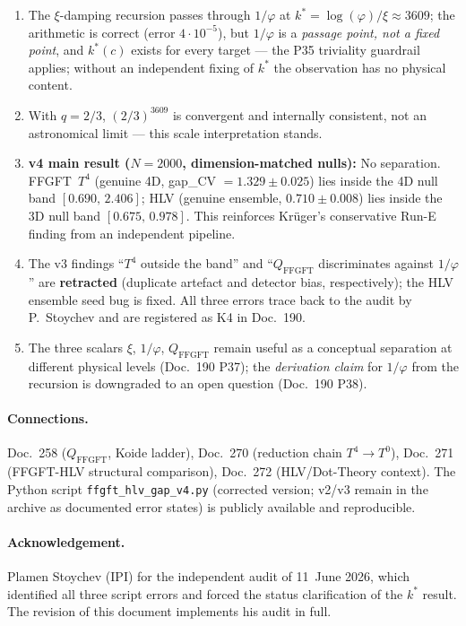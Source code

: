 \begin{enumerate}
  \item The $\xi$-damping recursion passes through $1/\varphi$ at
        $k^* = \log(\varphi)/\xi \approx 3609$; the arithmetic is
        correct (error $4{\cdot}10^{-5}$), but $1/\varphi$ is a
        \emph{passage point, not a fixed point}, and $k^*(c)$ exists
        for every target --- the P35 triviality guardrail applies;
        without an independent fixing of $k^*$ the observation has no
        physical content.
  \item With $q = 2/3$, $(2/3)^{3609}$ is convergent and internally
        consistent, not an astronomical limit --- this scale
        interpretation stands.
  \item \textbf{v4 main result ($N=2000$, dimension-matched nulls):}
        No separation. FFGFT~$T^4$ (genuine 4D,
        gap\_CV $=1.329\pm0.025$) lies inside the 4D null band
        $[0.690,\,2.406]$; HLV (genuine ensemble, $0.710\pm0.008$)
        lies inside the 3D null band $[0.675,\,0.978]$. This
        reinforces Krüger's conservative Run-E finding from an
        independent pipeline.
  \item The v3 findings \enquote{$T^4$ outside the band} and
        \enquote{$Q_\mathrm{FFGFT}$ discriminates against
        $1/\varphi$} are \textbf{retracted} (duplicate artefact and
        detector bias, respectively); the HLV ensemble seed bug is
        fixed. All three errors trace back to the audit by
        P.~Stoychev and are registered as K4 in Doc.~190.
  \item The three scalars $\xi$, $1/\varphi$, $Q_\mathrm{FFGFT}$
        remain useful as a conceptual separation at different physical
        levels (Doc.~190 P37); the \emph{derivation claim} for
        $1/\varphi$ from the recursion is downgraded to an open
        question (Doc.~190 P38).
\end{enumerate}

\paragraph{Connections.}
Doc.~258 ($Q_\mathrm{FFGFT}$, Koide ladder), Doc.~270 (reduction chain
$T^4\to T^0$), Doc.~271 (FFGFT-HLV structural comparison), Doc.~272
(HLV/Dot-Theory context). The Python script
\texttt{ffgft\_hlv\_gap\_v4.py} (corrected version; v2/v3 remain in
the archive as documented error states) is publicly available and
reproducible.

\paragraph{Acknowledgement.}
Plamen Stoychev (IPI) for the independent audit of 11~June 2026, which
identified all three script errors and forced the status clarification
of the $k^*$ result. The revision of this document implements his audit
in full.

